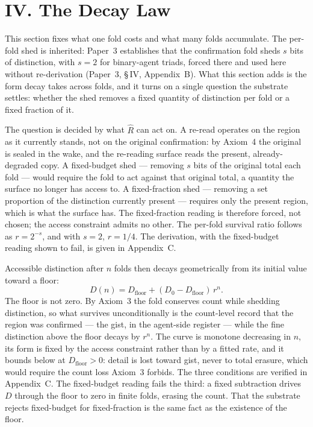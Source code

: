 \documentclass[11pt,oneside]{report}
\theoremstyle{definition}
\theoremstyle{remark}
\begin{document}
\section*{IV. The Decay Law}

This section fixes what one fold costs and what many folds accumulate.
The per-fold shed is inherited: Paper~3 establishes that the confirmation
fold sheds \ensuremath{s} bits of distinction, with \ensuremath{s = 2} for
binary-agent triads, forced there and used here without re-derivation
(Paper~3, \S\,IV, Appendix~B). What this section adds is the form decay
takes across folds, and it turns on a single question the substrate
settles: whether the shed removes a fixed quantity of distinction per
fold or a fixed fraction of it.

The question is decided by what \ensuremath{\hat{R}} can act on. A re-read
operates on the region as it currently stands, not on the original
confirmation: by Axiom~4 the original is sealed in the wake, and the
re-reading surface reads the present, already-degraded copy. A fixed-budget
shed --- removing \ensuremath{s} bits of the original total each fold ---
would require the fold to act against that original total, a quantity the
surface no longer has access to. A fixed-fraction shed --- removing a set
proportion of the distinction currently present --- requires only the
present region, which is what the surface has. The fixed-fraction reading
is therefore forced, not chosen; the access constraint admits no other.
The per-fold survival ratio follows as \ensuremath{r = 2^{-s}}, and with
\ensuremath{s = 2}, \ensuremath{r = 1/4}. The derivation, with the
fixed-budget reading shown to fail, is given in Appendix~C.

Accessible distinction after \ensuremath{n} folds then decays
geometrically from its initial value toward a floor:
\begin{equation*}
D(n) = D_{\mathrm{floor}} + (D_{0} - D_{\mathrm{floor}})\, r^{n}.
\end{equation*}
The floor is not zero. By Axiom~3 the fold conserves count while shedding
distinction, so what survives unconditionally is the count-level record
that the region was confirmed --- the gist, in the agent-side register ---
while the fine distinction above the floor decays by \ensuremath{r^{n}}.
The curve is monotone decreasing in \ensuremath{n}, its form is fixed by
the access constraint rather than by a fitted rate, and it bounds below at
\ensuremath{D_{\mathrm{floor}} > 0}: detail is lost toward gist, never to
total erasure, which would require the count loss Axiom~3 forbids. The
three conditions are verified in Appendix~C. The fixed-budget reading
fails the third: a fixed subtraction drives \ensuremath{D} through the
floor to zero in finite folds, erasing the count. That the substrate
rejects fixed-budget for fixed-fraction is the same fact as the existence
of the floor.
\end{document}
